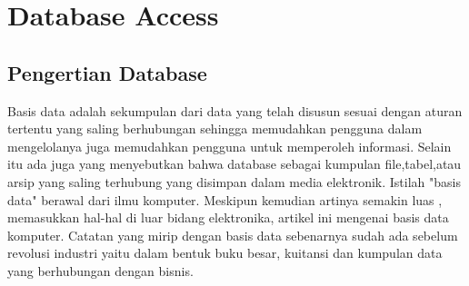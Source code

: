 
\section{Database Access}

\subsection{Pengertian Database}
	Basis data adalah sekumpulan dari data yang telah disusun sesuai dengan aturan tertentu yang saling berhubungan sehingga memudahkan pengguna dalam mengelolanya juga memudahkan pengguna untuk memperoleh informasi. Selain itu ada juga yang menyebutkan bahwa database sebagai kumpulan ﬁle,tabel,atau arsip yang saling terhubung yang disimpan dalam media elektronik.
	Istilah "basis data" berawal dari ilmu komputer. Meskipun kemudian artinya semakin luas , memasukkan hal-hal di luar bidang elektronika, artikel ini mengenai basis data komputer. Catatan yang mirip dengan basis data sebenarnya sudah ada sebelum revolusi industri yaitu dalam bentuk buku besar, kuitansi dan kumpulan data yang berhubungan dengan bisnis.

